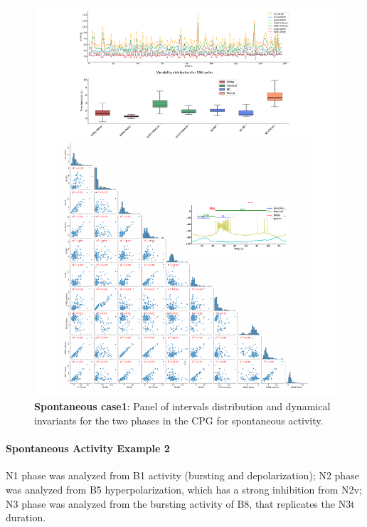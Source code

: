 \begin{figure}[htbp]
	\centering
	\includegraphics[width=1.1\textwidth]{./invariants/data/SUSSEX/prep1/images/2phases/panel_with_pairplot.pdf}
	\caption{\textbf{Spontaneous case1}: Panel of intervals distribution and dynamical invariants for the two phases in the CPG for spontaneous activity.}
	\label{fig:prep1 2 phases invariants pairplot}
\end{figure}

\paragraph{Spontaneous Activity Example 2}
N1 phase was analyzed from B1 activity (bursting and depolarization); N2 phase was analyzed from B5 hyperpolarization, which has a strong inhibition from N2v; N3 phase was analyzed from the bursting activity of B8, that replicates the N3t duration. 

